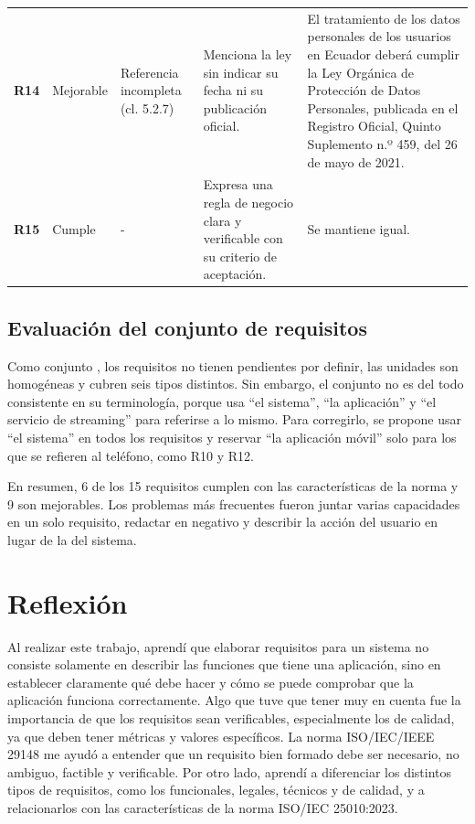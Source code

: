 \documentclass[conference,onecolumn]{IEEEtran}
\begin{document}
{\begin{longtable}{@{}L{0.05\textwidth}L{0.08\textwidth}L{0.15\textwidth}L{0.29\textwidth}L{0.36\textwidth}@{}}
\textbf{R14} & Mejorable & Referencia incompleta (cl. 5.2.7) & Menciona la ley sin indicar su fecha ni su publicación oficial. & El tratamiento de los datos personales de los usuarios en Ecuador deberá cumplir la Ley Orgánica de Protección de Datos Personales, publicada en el Registro Oficial, Quinto Suplemento n.º 459, del 26 de mayo de 2021.\\
\textbf{R15} & Cumple & - & Expresa una regla de negocio clara y verificable con su criterio de aceptación. & Se mantiene igual.\\
\end{longtable}
}

\subsection{Evaluación del conjunto de requisitos}

Como conjunto \cite[\nopp cl.~5.2.6]{ieee29148}, los requisitos no tienen pendientes por definir, las unidades son homogéneas y cubren seis tipos distintos. Sin embargo, el conjunto no es del todo consistente en su terminología, porque usa “el sistema”, “la aplicación” y “el servicio de streaming” para referirse a lo mismo. Para corregirlo, se propone usar “el sistema” en todos los requisitos y reservar “la aplicación móvil” solo para los que se refieren al teléfono, como R10 y R12.

En resumen, 6 de los 15 requisitos cumplen con las características de la norma y 9 son mejorables. Los problemas más frecuentes fueron juntar varias capacidades en un solo requisito, redactar en negativo y describir la acción del usuario en lugar de la del sistema.

\section{Reflexión}
Al realizar este trabajo, aprendí que elaborar requisitos para un sistema no consiste solamente en describir las funciones que tiene una aplicación, sino en establecer claramente qué debe hacer y cómo se puede comprobar que la aplicación funciona correctamente. Algo que tuve que tener muy en cuenta fue la importancia de que los requisitos sean verificables, especialmente los de calidad, ya que deben tener métricas y valores específicos. La norma ISO/IEC/IEEE 29148 me ayudó a entender que un requisito bien formado debe ser necesario, no ambiguo, factible y verificable. Por otro lado, aprendí a diferenciar los distintos tipos de requisitos, como los funcionales, legales, técnicos y de calidad, y a relacionarlos con las características de la norma ISO/IEC 25010:2023.
\end{document}
